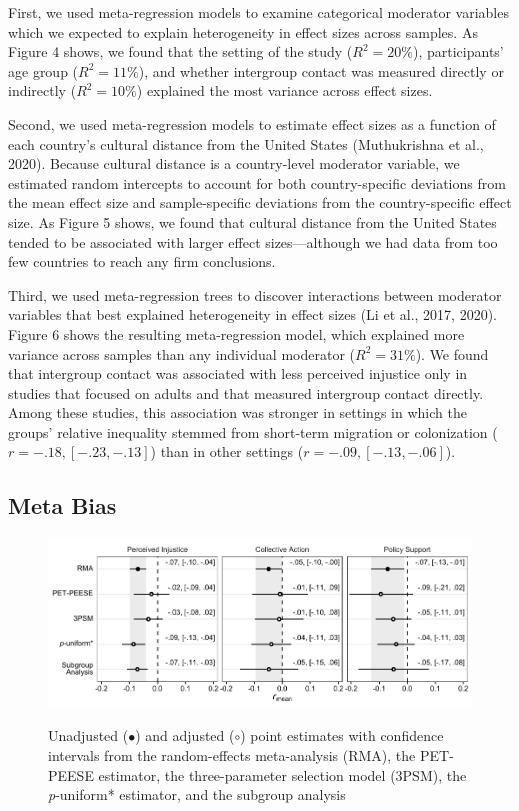 \documentclass[12pt, letterpaper]{article}
\begin{document}
First, we used meta-regression models to examine categorical moderator
variables which we expected to explain heterogeneity in effect sizes
across samples. As Figure 4 shows, we found that the setting of the
study (\(R^2 = 20\%\)), participants' age group (\(R^2 = 11\%\)), and
whether intergroup contact was measured directly or indirectly
(\(R^2 = 10\%\)) explained the most variance across effect sizes.

Second, we used meta-regression models to estimate effect sizes as a
function of each country's cultural distance from the United States
(Muthukrishna et al., 2020). Because cultural distance is a
country-level moderator variable, we estimated random intercepts to
account for both country-specific deviations from the mean effect size
and sample-specific deviations from the country-specific effect size. As
Figure 5 shows, we found that cultural distance from the United States
tended to be associated with larger effect sizes---although we had data
from too few countries to reach any firm conclusions.

Third, we used meta-regression trees to discover interactions between
moderator variables that best explained heterogeneity in effect sizes
(Li et al., 2017, 2020). Figure 6 shows the resulting meta-regression
model, which explained more variance across samples than any individual
moderator (\(R^2 = 31\%\)). We found that intergroup contact was
associated with less perceived injustice only in studies that focused on
adults and that measured intergroup contact directly. Among these
studies, this association was stronger in settings in which the groups'
relative inequality stemmed from short-term migration or colonization
(\(r = -.18, [-.23, -.13]\)) than in other settings
(\(r = -.09, [-.13, -.06]\)).

\hypertarget{meta-bias}{%
\subsection{Meta Bias}\label{meta-bias}}

\begin{figure}
\centering
\caption{Unadjusted ($\bullet$) and adjusted ($\circ$) point estimates with confidence intervals from the random-effects meta-analysis (RMA), the PET-PEESE estimator, the three-parameter selection model (3PSM), the \textit{p}-uniform* estimator, and the subgroup analysis}
\includegraphics[scale=1]{../figures/figure-7}
\label{fig:f7}
\end{figure}
\end{document}
